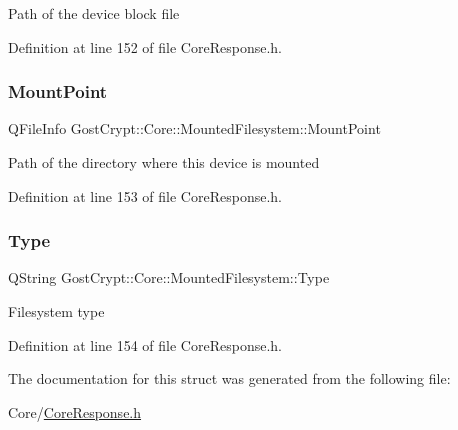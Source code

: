Path of the device block file 

Definition at line 152 of file Core\+Response.\+h.

\mbox{\label{struct_gost_crypt_1_1_core_1_1_mounted_filesystem_a122ef9f2f725100c1cfb1d71fcab73c1}} 
\subsubsection{\texorpdfstring{Mount\+Point}{MountPoint}}
{\footnotesize\ttfamily Q\+File\+Info Gost\+Crypt\+::\+Core\+::\+Mounted\+Filesystem\+::\+Mount\+Point}

Path of the directory where this device is mounted 

Definition at line 153 of file Core\+Response.\+h.

\mbox{\label{struct_gost_crypt_1_1_core_1_1_mounted_filesystem_a8ec3ff52e01e3d5f6b22237c30cc392d}} 
\subsubsection{\texorpdfstring{Type}{Type}}
{\footnotesize\ttfamily Q\+String Gost\+Crypt\+::\+Core\+::\+Mounted\+Filesystem\+::\+Type}

Filesystem type 

Definition at line 154 of file Core\+Response.\+h.



The documentation for this struct was generated from the following file\+:\begin{DoxyCompactItemize}
\item 
Core/\hyperlink{_core_response_8h}{Core\+Response.\+h}\end{DoxyCompactItemize}
